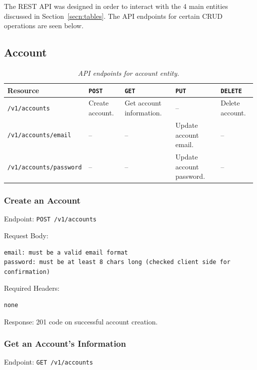 \documentclass[12pt,openany,a4paper]{book}
\newcommand{\secn}[1] {Section~\ref{#1}}	%
\begin{document}
The REST API was designed in order to interact with the 4 main entities
discussed in \secn{secn:tables}. The API endpoints for certain CRUD operations 
are seen below.

\subsection{Account}

\begin{table}[h]
\caption{\sl API endpoints for account entity.}
\label{tab:endpoint_account}
\begin{center}
\begin{tabularx}{\linewidth}{|l|X|X|X|X|}
\hline
Resource & \verb|POST| & \verb|GET| & \verb|PUT| & \verb|DELETE| \\
\hline
\verb|/v1/accounts| & Create account. & Get account information. & -- & Delete account. \\
\verb|/v1/accounts/email| & -- & -- & Update account email. & -- \\
\verb|/v1/accounts/password| & -- & -- & Update account password. & -- \\
\hline
\end{tabularx}
\end{center}
\end{table}

\subsubsection{Create an Account}

Endpoint: \verb|POST /v1/accounts|

Request Body:

\begin{verbatim}
email: must be a valid email format
password: must be at least 8 chars long (checked client side for confirmation)
\end{verbatim}

Required Headers:

\begin{verbatim}
none
\end{verbatim}

Response: 201 code on successful account creation.

\subsubsection{Get an Account's Information}

Endpoint: \verb|GET /v1/accounts|
\end{document}

